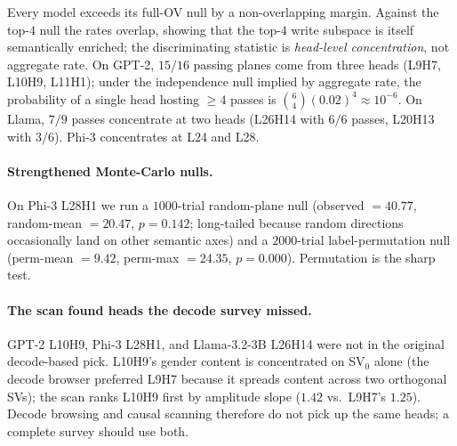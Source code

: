 \begin{table}[t]
\centering
\small
\caption{Blind causal-scan pass rates with $95\%$ Agresti--Coull
CIs. \emph{Compass}: top-$4$ SV-pairs per head. \emph{top-$4$
null}: random pair from the same top-$4$ write subspace.
\emph{full-OV null}: random pair from all of
$\mathbb{R}^{d_{\text{model}}}$.}
\label{tab:scan}
\end{table}

Every model exceeds its full-OV null by a non-overlapping margin.
Against the top-$4$ null the rates overlap, showing that the
top-$4$ write subspace is itself semantically enriched; the
discriminating statistic is \emph{head-level concentration}, not
aggregate rate. On GPT-2, $15/16$ passing planes come from three
heads (L9H7, L10H9, L11H1); under the independence null implied
by aggregate rate, the probability of a single head hosting
$\ge 4$ passes is $\binom{6}{4}(0.02)^4 \approx 10^{-6}$. On
Llama, $7/9$ passes concentrate at two heads (L26H14 with $6/6$
passes, L20H13 with $3/6$). Phi-3 concentrates at L24 and L28.

\paragraph{Strengthened Monte-Carlo nulls.} On Phi-3 L28H1 we run
a $1000$-trial random-plane null (observed $= 40.77$, random-mean
$= 20.47$, $p = 0.142$; long-tailed because random directions
occasionally land on other semantic axes) and a $2000$-trial
label-permutation null (perm-mean $= 9.42$, perm-max $= 24.35$,
$p = 0.000$). Permutation is the sharp test.

\paragraph{The scan found heads the decode survey missed.} GPT-2
L10H9, Phi-3 L28H1, and Llama-3.2-3B L26H14 were not in the
original decode-based pick. L10H9's gender content is concentrated
on SV$_0$ alone (the decode browser preferred L9H7 because it
spreads content across two orthogonal SVs); the scan ranks L10H9
first by amplitude slope ($1.42$ vs.\ L9H7's $1.25$). Decode
browsing and causal scanning therefore do not pick up the same
heads; a complete survey should use both.

